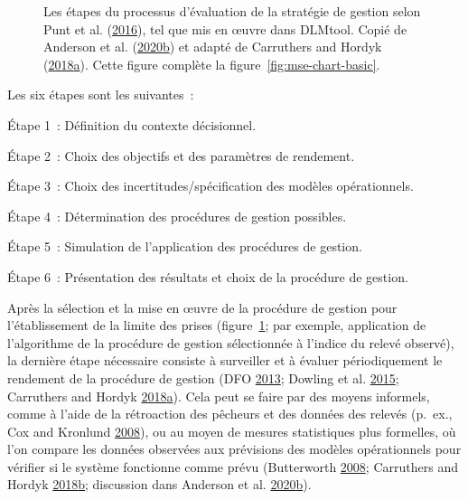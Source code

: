 \documentclass[11pt]{book}
\begin{document}
\begin{figure}[htb]

{\centering {} 

}

\caption{Les étapes du processus d'évaluation de la stratégie de gestion selon Punt et al. (\protect\hyperlink{ref-punt2016}{2016}), tel que mis en œuvre dans DLMtool. Copié de Anderson et al. (\protect\hyperlink{ref-anderson2020gfmp}{2020}\protect\hyperlink{ref-anderson2020gfmp}{b}) et adapté de Carruthers and Hordyk (\protect\hyperlink{ref-carruthers2018}{2018}\protect\hyperlink{ref-carruthers2018}{a}). Cette figure complète la figure~\ref{fig:mse-chart-basic}.}\label{fig:mse-chart}
\end{figure}
Les six étapes sont les suivantes~:

Étape 1~: Définition du contexte décisionnel.

Étape 2~: Choix des objectifs et des paramètres de rendement.

Étape 3~: Choix des incertitudes/spécification des modèles opérationnels.

Étape 4~: Détermination des procédures de gestion possibles.

Étape 5~: Simulation de l'application des procédures de gestion.

Étape 6~: Présentation des résultats et choix de la procédure de gestion.

Après la sélection et la mise en œuvre de la procédure de gestion pour l'établissement de la limite des prises (figure~\ref{fig:mse-chart}; par exemple, application de l'algorithme de la procédure de gestion sélectionnée à l'indice du relevé observé), la dernière étape nécessaire consiste à surveiller et à évaluer périodiquement le rendement de la procédure de gestion (DFO \protect\hyperlink{ref-dfo2013}{2013}; Dowling et al. \protect\hyperlink{ref-dowling2015a}{2015}; Carruthers and Hordyk \protect\hyperlink{ref-carruthers2018}{2018}\protect\hyperlink{ref-carruthers2018}{a}). Cela peut se faire par des moyens informels, comme à l'aide de la rétroaction des pêcheurs et des données des relevés (p.~ex., Cox and Kronlund \protect\hyperlink{ref-cox2008a}{2008}), ou au moyen de mesures statistiques plus formelles, où l'on compare les données observées aux prévisions des modèles opérationnels pour vérifier si le système fonctionne comme prévu (Butterworth \protect\hyperlink{ref-butterworth2008}{2008}; Carruthers and Hordyk \protect\hyperlink{ref-carruthers_hordyk_2018}{2018}\protect\hyperlink{ref-carruthers_hordyk_2018}{b}; discussion dans Anderson et al. \protect\hyperlink{ref-anderson2020gfmp}{2020}\protect\hyperlink{ref-anderson2020gfmp}{b}).
\end{document}

